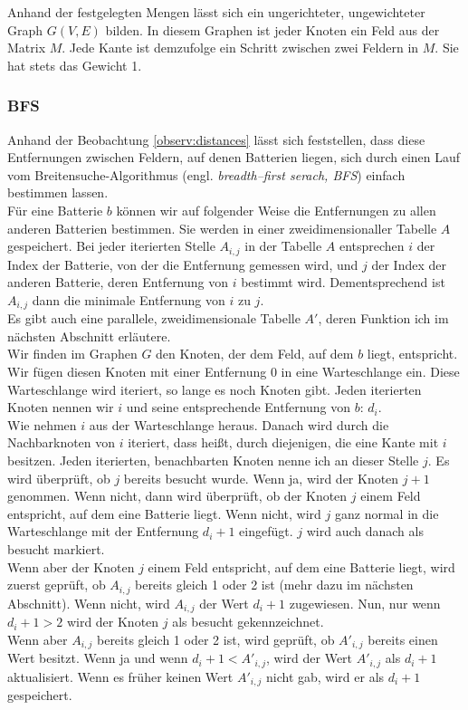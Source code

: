 \documentclass[a4paper,10pt,ngerman]{scrartcl}
\begin{document}
Anhand der festgelegten Mengen lässt sich ein ungerichteter, ungewichteter Graph $G(V, E)$ bilden.
In diesem Graphen ist jeder Knoten ein Feld aus der Matrix $M$. Jede Kante ist demzufolge ein
Schritt zwischen zwei Feldern in $M$. Sie hat stets das Gewicht 1.

\subsubsection{BFS}
Anhand der Beobachtung \ref{observ:distances} lässt sich feststellen, dass diese Entfernungen zwischen Feldern,
auf denen Batterien liegen, sich durch einen Lauf vom Breitensuche-Algorithmus 
(engl. \textit{breadth--first serach, BFS}) einfach bestimmen lassen.\\

Für eine Batterie $b$ können wir auf folgender Weise die Entfernungen zu allen anderen Batterien bestimmen.
Sie werden in einer zweidimensionaller Tabelle $A$ gespeichert.
Bei jeder iterierten Stelle $A_{i,j}$ in der Tabelle $A$ entsprechen $i$ der Index der Batterie,
von der die Entfernung gemessen wird, und $j$ der Index der anderen Batterie, deren Entfernung von $i$ bestimmt wird.
Dementsprechend ist $A_{i,j}$ dann die minimale Entfernung von $i$ zu $j$.\\
Es gibt auch eine parallele, zweidimensionale Tabelle $A'$, deren Funktion ich im nächsten Abschnitt erläutere.\\
Wir finden im Graphen $G$ den Knoten, der dem Feld, auf dem $b$ liegt, entspricht.
Wir fügen diesen Knoten mit einer Entfernung 0 in eine Warteschlange ein.
Diese Warteschlange wird iteriert, so lange es noch Knoten gibt.
Jeden iterierten Knoten nennen wir $i$ und seine entsprechende Entfernung von $b$: $d_i$.\\
Wie nehmen $i$ aus der Warteschlange heraus. 
Danach wird durch die Nachbarknoten von $i$ iteriert, dass heißt, durch diejenigen, die eine Kante mit $i$ besitzen.
Jeden iterierten, benachbarten Knoten nenne ich an dieser Stelle $j$.
Es wird überprüft, ob $j$ bereits besucht wurde. Wenn ja, wird der Knoten $j+1$ genommen.
Wenn nicht, dann wird überprüft, ob der Knoten $j$ einem Feld entspricht, auf dem eine Batterie liegt.
Wenn nicht, wird $j$ ganz normal in die Warteschlange mit der Entfernung $d_i + 1$ eingefügt.
$j$ wird auch danach als besucht markiert.\\
Wenn aber der Knoten $j$ einem Feld entspricht, auf dem eine Batterie liegt, wird zuerst geprüft,
ob $A_{i,j}$ bereits gleich 1 oder 2 ist (mehr dazu im nächsten Abschnitt).
Wenn nicht, wird $A_{i,j}$ der Wert $d_i + 1$ zugewiesen. Nun, nur wenn $d_i + 1 > 2$ wird der Knoten $j$ als
besucht gekennzeichnet.\\
Wenn aber $A_{i,j}$ bereits gleich 1 oder 2 ist, wird geprüft, ob $A'_{i,j}$ bereits einen Wert besitzt.
Wenn ja und wenn $d_i + 1 < A'_{i,j}$, wird der Wert $A'_{i,j}$ als $d_i + 1$ aktualisiert. 
Wenn es früher keinen Wert $A'_{i,j}$ nicht gab, wird er als $d_i + 1$ gespeichert.\\
\end{document}
